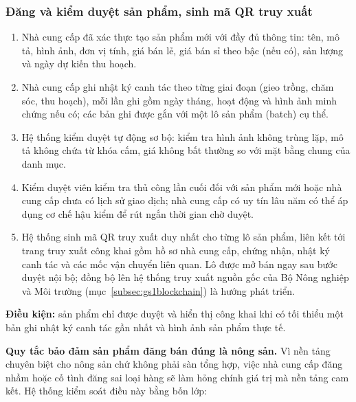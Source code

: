 \subsubsection*{Đăng và kiểm duyệt sản phẩm, sinh mã QR truy xuất}
\begin{enumerate}
    \item Nhà cung cấp đã xác thực tạo sản phẩm mới với đầy đủ thông tin: tên, mô tả, hình ảnh, đơn vị tính, giá bán lẻ, giá bán sỉ theo bậc (nếu có), sản lượng và ngày dự kiến thu hoạch.
    \item Nhà cung cấp ghi nhật ký canh tác theo từng giai đoạn (gieo trồng, chăm sóc, thu hoạch), mỗi lần ghi gồm ngày tháng, hoạt động và hình ảnh minh chứng nếu có; các bản ghi được gắn với một lô sản phẩm (batch) cụ thể.
    \item Hệ thống kiểm duyệt tự động sơ bộ: kiểm tra hình ảnh không trùng lặp, mô tả không chứa từ khóa cấm, giá không bất thường so với mặt bằng chung của danh mục.
    \item Kiểm duyệt viên kiểm tra thủ công lần cuối đối với sản phẩm mới hoặc nhà cung cấp chưa có lịch sử giao dịch; nhà cung cấp có uy tín lâu năm có thể áp dụng cơ chế hậu kiểm để rút ngắn thời gian chờ duyệt.
    \item Hệ thống sinh mã QR truy xuất duy nhất cho từng lô sản phẩm, liên kết tới trang truy xuất công khai gồm hồ sơ nhà cung cấp, chứng nhận, nhật ký canh tác và các mốc vận chuyển liên quan. Lô được mở bán ngay sau bước duyệt nội bộ; đồng bộ lên hệ thống truy xuất nguồn gốc của Bộ Nông nghiệp và Môi trường (mục~\ref{subsec:gs1blockchain}) là hướng phát triển.
\end{enumerate}

\noindent\textbf{Điều kiện:} sản phẩm chỉ được duyệt và hiển thị công khai khi có tối thiểu một bản ghi nhật ký canh tác gần nhất và hình ảnh sản phẩm thực tế.

\noindent\textbf{Quy tắc bảo đảm sản phẩm đăng bán đúng là nông sản.} Vì nền tảng chuyên biệt cho nông sản chứ không phải sàn tổng hợp, việc nhà cung cấp đăng nhầm hoặc cố tình đăng sai loại hàng sẽ làm hỏng chính giá trị mà nền tảng cam kết. Hệ thống kiểm soát điều này bằng bốn lớp:


